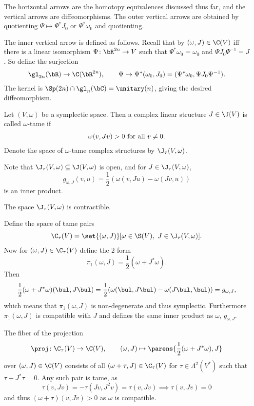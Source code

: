     The horizontal arrows are the homotopy equivalences discussed thus far, and the vertical arrows are diffeomorphisms.
    The outer vertical arrows are obtained by quotienting $\Psi\mapsto\Psi^*J_0$ or $\Psi^*\omega_0$ and quotienting.

    The inner vertical arrow is defined as follows.
    Recall that by  $(\omega,J)\in\C(V)$ iff there is a linear isomorphism $\Psi\colon\bR^{2n}\to V$ such that $\Psi^*\omega_0=\omega_0$ and $\Psi J_0\Psi^{-1}=J$.
    So define the surjection
    $$ \gl_{2n}(\bR) \to \C(\bR^{2n}),\qquad \Psi \mapsto \Psi^*(\omega_0,J_0) = (\Psi^*\omega_0,\Psi J_0\Psi^{-1}) . $$
    The kernel is $\Sp(2n)\cap\gl_n(\bC)=\unitary(n)$, giving the desired diffeomorphism.

\eremark

\bdefn

    Let $(V,\omega)$ be a symplectic space.
    Then a complex linear structure $J\in\J(V)$ is called {\emphcolor $\omega$-tame} if
    $$ \omega(v,Jv) > 0 \hbox{ for all $v\neq0$} . $$
    Denote the space of $\omega$-tame complex structures by $\J_\tau(V,\omega)$.

\edefn

Note that $\J_\tau(V,\omega)\subseteq\J(V,\omega)$ is open, and for $J\in\J_\tau(V,\omega)$,
$$ g_{\omega,J}(v,u) = \frac12(\omega(v,Ju) - \omega(Jv,u)) $$
is an inner product.

\bprop

    The space $\J_\tau(V,\omega)$ is contractible.

\eprop

\bproof

    Define the space of tame pairs
    $$ \C_\tau(V) = \set{(\omega,J)}[\omega\in\S(V),\ J\in\J_\tau(V,\omega)] . $$
    Now for $(\omega,J)\in\C_\tau(V)$ define the $2$-form
    $$ \pi_1(\omega,J) = \frac12(\omega + J^*\omega) . $$
    Then
    $$ \frac12(\omega + J^*\omega)(\bul,J\bul) = \frac12(\omega(\bul,J\bul) - \omega(J\bul,\bul)) = g_{\omega,J} , $$
    which means that $\pi_1(\omega,J)$ is non-degenerate and thus symplectic.
    Furthermore $\pi_1(\omega,J)$ is compatible with $J$ and defines the same inner product as $\omega$, $g_{\omega,J}$.

    The fiber of the projection
    $$ \proj\colon\C_\tau(V) \to \C(V),\qquad (\omega,J) \mapsto \parens{\frac12(\omega+J^*\omega),J} $$
    over $(\omega,J)\in\C(V)$ consists of all $(\omega+\tau,J)\in\C_\tau(V)$ for $\tau\in\Lambda^2(V^*)$ such that $\tau+J^*\tau=0$.
    Any such pair is tame, as
    $$ \tau(v,Jv) = -\tau(Jv,J^2v) = \tau(v,Jv) \implies \tau(v,Jv) = 0 $$
    and thus $(\omega+\tau)(v,Jv)>0$ as $\omega$ is compatible.

